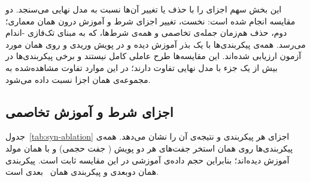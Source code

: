 این بخش سهم اجزای  را با حذف یا تغییر آن‌ها نسبت به مدل نهایی می‌سنجد. دو مقایسه انجام شده است: نخست، تغییر اجزای شرط و آموزش درون همان معماری؛ دوم، حذف هم‌زمان جمله‌ی تخاصمی و همه‌ی شرط‌ها، که به مبنای تک‌فازی -اندام می‌رسد. همه‌ی پیکربندی‌ها با یک بذر آموزش دیده و در پویش وریدی و روی همان  مورد آزمون ارزیابی شده‌اند. این مقایسه‌ها طرح عاملی کامل نیستند و برخی پیکربندی‌ها در بیش از یک جزء با مدل نهایی تفاوت دارند؛ در این موارد تفاوت مشاهده‌شده به مجموعه‌ی همان اجزا نسبت داده می‌شود.

\subsection{اجزای شرط و آموزش تخاصمی}

جدول~\ref{tab:syn-ablation} اجزای هر پیکربندی و نتیجه‌ی آن را نشان می‌دهد. همه‌ی پیکربندی‌ها روی همان استخر جفت‌های هر دو پویش ( جفت حجمی) و با همان مولد  آموزش دیده‌اند؛ بنابراین حجم داده‌ی آموزشی در این مقایسه ثابت است. پیکربندی  همان  دوبعدی و پیکربندی  همان  ~بعدی است.

